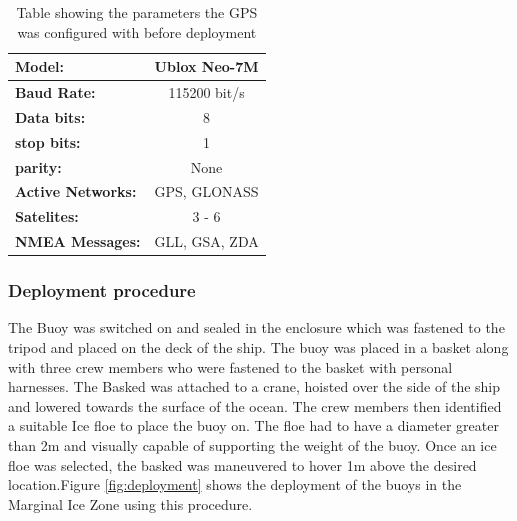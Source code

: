 \begin{table}[H]
    \centering
    \caption{Table showing the parameters the GPS was configured with before deployment }
    \begin{tabular}{|l|c|}
    \hline
    \textbf{Model:} & Ublox Neo-7M \\
    \hline
       \textbf{Baud Rate:}  & 115200 bit/s \\
       \hline
       \textbf{Data bits:} & 8 \\
       \hline
       \textbf{stop bits:} & 1 \\
       \hline
       \textbf{parity:} & None \\
       \hline
       \textbf{Active Networks:} & GPS, GLONASS \\
       \hline
       \textbf{Satelites:} & 3 - 6 \\
       \hline
       \textbf{NMEA Messages:} & GLL, GSA, ZDA \\
       \hline
    \end{tabular}

    \label{tab:test_remotetest_gpsconfig}
\end{table}

\subsubsection{Deployment procedure}

The  Buoy was switched on and sealed in the enclosure which was fastened to the tripod and placed on the deck of the ship. The buoy was placed in a basket along with three crew members who were fastened to the basket with personal harnesses. The Basked was attached to a crane, hoisted over the side of the ship and lowered towards the surface of the ocean. The crew members then identified a suitable Ice floe to place the buoy on. The floe had to have a diameter greater than 2m and visually capable of supporting the weight of the buoy. Once an ice floe was selected, the basked was maneuvered to hover 1m above the desired location.Figure \ref{fig:deployment}  shows the deployment of the buoys in the Marginal Ice Zone using this procedure. 

